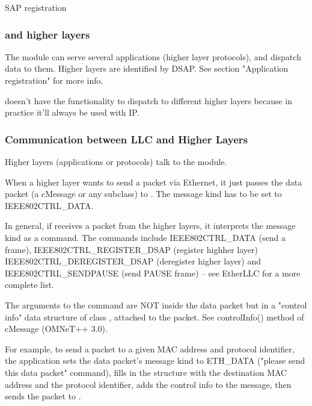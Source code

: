 SAP registration


\subsubsection{ and higher layers}

The  module can serve several applications (higher layer protocols),
and dispatch data to them. Higher layers are identified by DSAP.
See section "Application registration" for more info.

 doesn't have the functionality to dispatch to different
higher layers because in practice it'll always be used with IP.

\subsubsection{Communication between LLC and Higher Layers}

Higher layers (applications or protocols) talk to the  module.

When a higher layer wants to send a packet via Ethernet, it just
passes the data packet (a cMessage or any subclass) to .
The message kind has to be set to IEEE802CTRL\_DATA.

In general, if  receives a packet from the higher layers,
it interprets the message kind as a command. The commands include
IEEE802CTRL\_DATA (send a frame), IEEE802CTRL\_REGISTER\_DSAP (register highher layer)
IEEE802CTRL\_DEREGISTER\_DSAP (deregister higher layer) and IEEE802CTRL\_SENDPAUSE
(send PAUSE frame) -- see EtherLLC for a more complete list.

The arguments to the command are NOT inside the data packet but
in a "control info" data structure of class , attached to
the packet. See controlInfo() method of cMessage (OMNeT++ 3.0).

For example, to send a packet to a given MAC address and protocol
identifier, the application sets the data packet's message kind
to ETH\_DATA ("please send this data packet" command),
fills in the  structure with the destination MAC address and
the protocol identifier, adds the control info to the message, then sends
the packet to .

